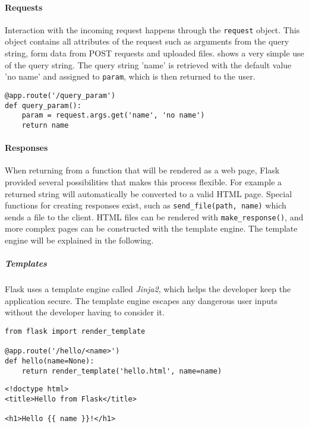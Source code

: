 \paragraph{Requests}
Interaction with the incoming request happens through the \texttt{request} object.
This object contains all attributes of the request such as arguments from the query string, form data from POST requests and uploaded files.
 shows a very simple use of the query string.
The query string 'name' is retrieved with the default value 'no name' and assigned to \texttt{param}, which is then returned to the user.

\begin{lstlisting}[style=python, caption='Simple use of the query string', label=query_string]
@app.route('/query_param')
def query_param():
    param = request.args.get('name', 'no name')
    return name
\end{lstlisting}

\paragraph{Responses}
When returning from a function that will be rendered as a web page, Flask provided several possibilities that makes this process flexible.
For example a returned string will automatically be converted to a valid HTML page.
Special functions for creating responses exist, such as \texttt{send\_file(path, name)} which sends a file to the client.
HTML files can be rendered with \texttt{make\_response()}, and more complex pages can be constructed with the template engine.
The template engine will be explained in the following.

\subparagraph{Templates}
Flask uses a template engine called \emph{Jinja2}, which helps the developer keep the application secure.
The template engine escapes any dangerous user inputs without the developer having to consider it.

\begin{lstlisting}[style=python, caption='Rendering a template that displays the name parameter', label=template]
from flask import render_template
  
@app.route('/hello/<name>')
def hello(name=None):
    return render_template('hello.html', name=name)
\end{lstlisting}

\begin{lstlisting}[style=python, caption='The Jinja2 template used by the hello example', label=template_html]
<!doctype html>
<title>Hello from Flask</title>

<h1>Hello {{ name }}!</h1>
\end{lstlisting}

